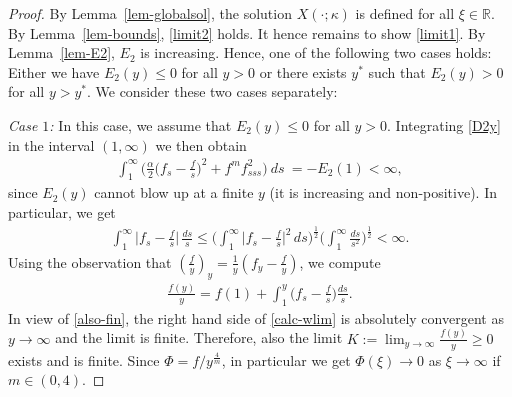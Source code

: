 \documentclass{article}%
\newcommand{\alp}{\alpha}
\newcommand{\kap}{\kappa}
\newcommand{\R}{\mathbb{R}}
\begin{document}
\begin{proof} %
By Lemma~\ref{lem-globalsol}, the solution $X(\cdot;\kap)$ is defined for all $\xi \in \R$. 
By Lemma~\ref{lem-bounds}, \eqref{limit2} holds. It hence remains to show \eqref{limit1}. 
By Lemma~\ref{lem-E2}, $E_2$ is increasing. Hence, one of the following two cases holds: 
Either we have $E_{2}(y) \leq 0$ for all $y > 0$ or there exists $y^*$ such that $E_{2}(y) >0$ 
for all $y > y^*$. We consider these two cases separately:

\medskip

{\it Case $1$:} In this case, we assume that $E_{2}(y) \leq 0$ for all $y >0$. 
Integrating \eqref{D2y} in the interval $\left( 1,\infty\right)$ we then obtain
  \begin{align}\label{diss-fin} %
    \int_{1}^{\infty} \Big( \frac{\alp}{2}\Big( f_{s}-\frac{f}{s} \Big) ^{2} + f^{m}f_{sss}^2  \Big)\ ds \
    =-E_2(1)<\infty,
  \end{align}
since $E_2(y)$ cannot blow up at a finite $y$ (it is increasing and non-positive). 
In particular, we get
  \begin{align} \label{also-fin} %
    \int_{1}^{\infty} \Big|f_s-\frac fs \Big| \, \frac{ds}s %
    \leq\Big( \int_{1}^{\infty}\Big|f_s-\frac fs\Big|^{2}\,ds\Big)^{\frac{1}{2}}
\Big( \int_{1}^{\infty}\frac{ds}{s^{2}}\Big)^{\frac{1}{2}} < \infty.
  \end{align}
Using the observation that $(\frac fy)_y = \frac 1 y(f_y- \frac fy)$, we compute
  \begin{align}\label{calc-wlim} %
    \frac{f(y)}y = f(1) + \int_{1}^{y} \Big(f_s-\frac fs\Big) \frac{ds}{s}.
  \end{align}
In view of \eqref{also-fin}, the right hand side of \eqref{calc-wlim} is absolutely 
convergent as $y \to \infty$ and the limit is finite. Therefore, also the limit 
$K := \lim_{y\to\infty}\frac{f( y) }{y} \geq 0$ exists and is finite. 
Since $\Phi=f/y^{{\frac 4m}}$, in particular we get $\Phi(\xi) \to 0$ as $\xi \to \infty$ 
if $m \in (0,4)$.

\medskip


\end{proof}
\end{document}
